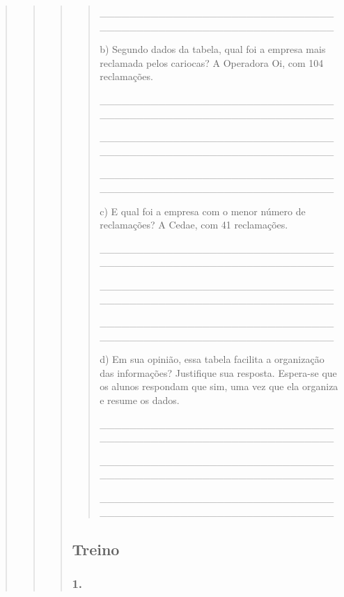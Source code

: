 \begin{quote}
\begin{quote}
\begin{quote}
\begin{quote}
\_\_\_\_\_\_\_\_\_\_\_\_\_\_\_\_\_\_\_\_\_\_\_\_\_\_\_\_\_\_\_\_\_\_\_\_\_\_\_\_\_\_\_\_\_\_\_\_\_\_\_\_\_\_\_\_\_\_\_\_\_\_\_\_

b) Segundo dados da tabela, qual foi a empresa mais reclamada pelos
cariocas? A Operadora Oi, com 104 reclamações.

\_\_\_\_\_\_\_\_\_\_\_\_\_\_\_\_\_\_\_\_\_\_\_\_\_\_\_\_\_\_\_\_\_\_\_\_\_\_\_\_\_\_\_\_\_\_\_\_\_\_\_\_\_\_\_\_\_\_\_\_\_\_\_\_

\_\_\_\_\_\_\_\_\_\_\_\_\_\_\_\_\_\_\_\_\_\_\_\_\_\_\_\_\_\_\_\_\_\_\_\_\_\_\_\_\_\_\_\_\_\_\_\_\_\_\_\_\_\_\_\_\_\_\_\_\_\_\_\_

\_\_\_\_\_\_\_\_\_\_\_\_\_\_\_\_\_\_\_\_\_\_\_\_\_\_\_\_\_\_\_\_\_\_\_\_\_\_\_\_\_\_\_\_\_\_\_\_\_\_\_\_\_\_\_\_\_\_\_\_\_\_\_\_

c) E qual foi a empresa com o menor número de reclamações? A Cedae, com
41 reclamações.

\protect\hypertarget{_Hlk128145702}{}{}\_\_\_\_\_\_\_\_\_\_\_\_\_\_\_\_\_\_\_\_\_\_\_\_\_\_\_\_\_\_\_\_\_\_\_\_\_\_\_\_\_\_\_\_\_\_\_\_\_\_\_\_\_\_\_\_\_\_\_\_\_\_\_\_

\_\_\_\_\_\_\_\_\_\_\_\_\_\_\_\_\_\_\_\_\_\_\_\_\_\_\_\_\_\_\_\_\_\_\_\_\_\_\_\_\_\_\_\_\_\_\_\_\_\_\_\_\_\_\_\_\_\_\_\_\_\_\_\_

\_\_\_\_\_\_\_\_\_\_\_\_\_\_\_\_\_\_\_\_\_\_\_\_\_\_\_\_\_\_\_\_\_\_\_\_\_\_\_\_\_\_\_\_\_\_\_\_\_\_\_\_\_\_\_\_\_\_\_\_\_\_\_\_

d) Em sua opinião, essa tabela facilita a organização das informações?
Justifique sua resposta. Espera-se que os alunos respondam que sim, uma
vez que ela organiza e resume os dados.

\_\_\_\_\_\_\_\_\_\_\_\_\_\_\_\_\_\_\_\_\_\_\_\_\_\_\_\_\_\_\_\_\_\_\_\_\_\_\_\_\_\_\_\_\_\_\_\_\_\_\_\_\_\_\_\_\_\_\_\_\_\_\_\_

\_\_\_\_\_\_\_\_\_\_\_\_\_\_\_\_\_\_\_\_\_\_\_\_\_\_\_\_\_\_\_\_\_\_\_\_\_\_\_\_\_\_\_\_\_\_\_\_\_\_\_\_\_\_\_\_\_\_\_\_\_\_\_\_

\_\_\_\_\_\_\_\_\_\_\_\_\_\_\_\_\_\_\_\_\_\_\_\_\_\_\_\_\_\_\_\_\_\_\_\_\_\_\_\_\_\_\_\_\_\_\_\_\_\_\_\_\_\_\_\_\_\_\_\_\_\_\_\_
\end{quote}

\subsection{Treino}\label{treino-8}

\subsubsection{1.}\label{section-68}


\end{quote}
\end{quote}
\end{quote}
